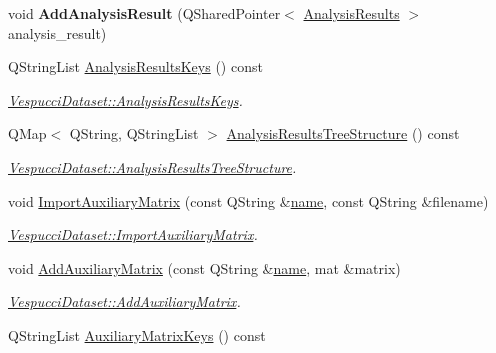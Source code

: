 \begin{DoxyCompactItemize}
\item 
void {\bfseries Add\+Analysis\+Result} (Q\+Shared\+Pointer$<$ \hyperlink{class_analysis_results}{Analysis\+Results} $>$ analysis\+\_\+result)\hypertarget{class_vespucci_dataset_a73e76a4dee12da663c03c475d49749a1}{}\label{class_vespucci_dataset_a73e76a4dee12da663c03c475d49749a1}

\item 
Q\+String\+List \hyperlink{class_vespucci_dataset_a5d12a825cb008d970b11c6c38a611bef}{Analysis\+Results\+Keys} () const 
\begin{DoxyCompactList}\small\item\em \hyperlink{class_vespucci_dataset_a5d12a825cb008d970b11c6c38a611bef}{Vespucci\+Dataset\+::\+Analysis\+Results\+Keys}. \end{DoxyCompactList}\item 
Q\+Map$<$ Q\+String, Q\+String\+List $>$ \hyperlink{class_vespucci_dataset_aa29b9760b0d21105b5f011badad7c247}{Analysis\+Results\+Tree\+Structure} () const 
\begin{DoxyCompactList}\small\item\em \hyperlink{class_vespucci_dataset_aa29b9760b0d21105b5f011badad7c247}{Vespucci\+Dataset\+::\+Analysis\+Results\+Tree\+Structure}. \end{DoxyCompactList}\item 
void \hyperlink{class_vespucci_dataset_ad38a3afd363e965c1b79b3e56a02f5b9}{Import\+Auxiliary\+Matrix} (const Q\+String \&\hyperlink{class_vespucci_dataset_a345a51b60127316b41caf92dc88fd792}{name}, const Q\+String \&filename)
\begin{DoxyCompactList}\small\item\em \hyperlink{class_vespucci_dataset_ad38a3afd363e965c1b79b3e56a02f5b9}{Vespucci\+Dataset\+::\+Import\+Auxiliary\+Matrix}. \end{DoxyCompactList}\item 
void \hyperlink{class_vespucci_dataset_a2d4dc95c890769ffb97c8fc3b2d6bb27}{Add\+Auxiliary\+Matrix} (const Q\+String \&\hyperlink{class_vespucci_dataset_a345a51b60127316b41caf92dc88fd792}{name}, mat \&matrix)
\begin{DoxyCompactList}\small\item\em \hyperlink{class_vespucci_dataset_a2d4dc95c890769ffb97c8fc3b2d6bb27}{Vespucci\+Dataset\+::\+Add\+Auxiliary\+Matrix}. \end{DoxyCompactList}\item 
Q\+String\+List \hyperlink{class_vespucci_dataset_ade1b203a4057345971c5949b804bf039}{Auxiliary\+Matrix\+Keys} () const 

\end{DoxyCompactItemize}
